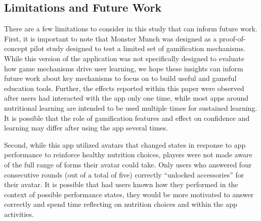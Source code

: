 


\vspace{-5pt}
\subsection{Limitations and Future Work}




There are a few limitations to consider in this study that can inform future work. First, it is important to note that Monster Munch was designed as a proof-of-concept pilot study designed to test a limited set of gamification mechanisms. While this version of the application was not specifically designed to evaluate how game mechanisms drive user learning, we hope these insights can inform future work about key mechanisms to focus on to build useful and gameful education tools. Further, the effects reported within this paper were observed after users had interacted with the app only one time, while most apps around nutritional learning are intended to be used multiple times for sustained learning. It is possible that the role of gamification features and effect on confidence and learning may differ after using the app several times.

Second, while this app utilized avatars that changed states in response to app performance to reinforce healthy nutrition choices, players were not made aware of the full range of forms their avatar could take. Only users who answered four consecutive rounds (out of a total of five) correctly ``unlocked accessories'' for their avatar. It is possible that had users known how they performed in the context of possible performance states, they would be more motivated to answer correctly and spend time reflecting on nutrition choices and within the app activities. 


